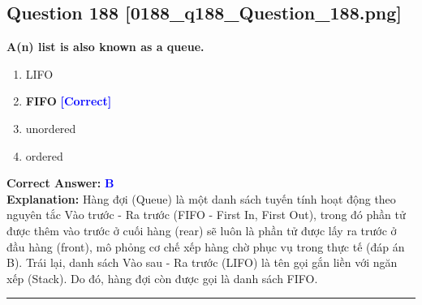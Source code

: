 \documentclass[11pt,a4paper]{article}
\begin{document}
\begin{minipage}{\textwidth}
\subsection*{Question 188 \quad \footnotesize{[0188\_q188\_Question\_188.png]}}
\noindent \textbf{A(n) list is also known as a queue.}

\begin{enumerate}[label=\Alph*.]
    \item LIFO
    \item \textbf{FIFO} \hfill \textcolor{blue}{\textbf{[Correct]}}
    \item unordered
    \item ordered
\end{enumerate}

\noindent \textbf{Correct Answer:} \textcolor{blue}{\textbf{B}} \\[2pt]
\noindent \textbf{Explanation:} Hàng đợi (Queue) là một danh sách tuyến tính hoạt động theo nguyên tắc Vào trước - Ra trước (FIFO - First In, First Out), trong đó phần tử được thêm vào trước ở cuối hàng (rear) sẽ luôn là phần tử được lấy ra trước ở đầu hàng (front), mô phỏng cơ chế xếp hàng chờ phục vụ trong thực tế (đáp án B). Trái lại, danh sách Vào sau - Ra trước (LIFO) là tên gọi gắn liền với ngăn xếp (Stack). Do đó, hàng đợi còn được gọi là danh sách FIFO.

\par\vspace{0.3cm}
\hrule
\vspace{0.3cm}
\end{minipage}
\end{document}
